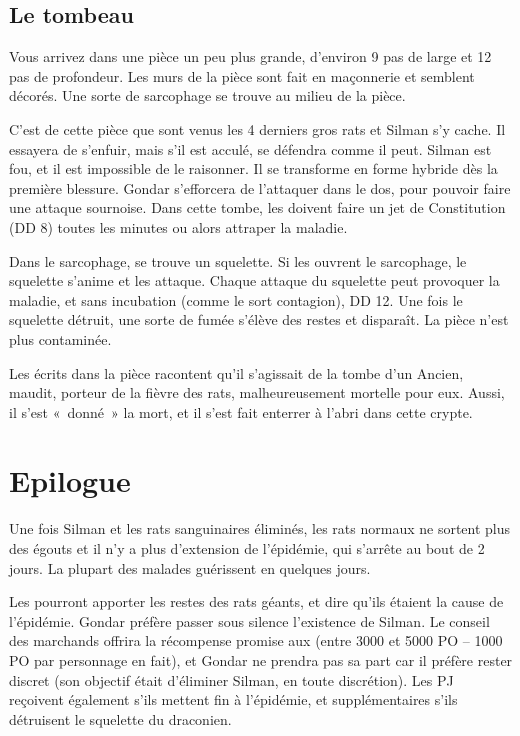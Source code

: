 \documentclass[a4paper,10pt,openany]{book}
\begin{document}
\begin{multicols}{2}
\subsection{Le tombeau}
\begin{paperbox}{ }
	Vous arrivez dans une pièce un peu plus grande, d’environ 9 pas de large et 12 pas de profondeur. Les murs de la pièce sont fait en maçonnerie et
	semblent décorés. Une sorte de sarcophage se trouve au milieu de la pièce.
\end{paperbox}

C’est de cette pièce que sont venus les 4 derniers gros rats et Silman s’y cache. Il essayera de s’enfuir, mais s’il est acculé, se défendra comme il
peut. Silman est fou, et il est impossible de le raisonner. Il se transforme en forme hybride dès la première blessure. Gondar s’efforcera de
l’attaquer dans le dos, pour pouvoir faire une attaque sournoise. Dans  cette tombe, les \PJs doivent faire un jet de Constitution (DD 8) toutes les
minutes ou alors attraper la maladie.\par Dans le sarcophage, se trouve un squelette. Si les \PJs ouvrent le sarcophage, le squelette s’anime et les
attaque. Chaque attaque du squelette peut provoquer la maladie, et sans incubation (comme le sort contagion), DD 12. Une fois le squelette détruit,
une sorte de fumée s’élève des restes et disparaît. La pièce n’est plus contaminée.\par Les écrits dans la pièce racontent qu’il s’agissait de la
tombe d’un Ancien, maudit, porteur de la fièvre des rats, malheureusement mortelle pour eux. Aussi, il s’est « donné » la mort, et il s’est fait
enterrer à l’abri dans cette crypte.

\section{Epilogue}
Une fois Silman et les rats sanguinaires éliminés, les rats normaux ne sortent plus des égouts et il n’y a plus d’extension de l’épidémie, qui
s’arrête au bout de 2 jours. La plupart des malades guérissent en quelques jours.\par Les \PJs pourront apporter les restes des rats géants, et dire
qu’ils étaient la cause de l’épidémie. Gondar préfère passer sous silence l’existence de Silman. Le conseil des marchands offrira la récompense
promise aux \PJs (entre 3000 et 5000 PO – 1000 PO par personnage en fait), et Gondar ne prendra pas sa part car il préfère rester discret (son
objectif était d’éliminer Silman, en toute discrétion). Les PJ reçoivent également  s’ils mettent fin à l’épidémie, et  supplémentaires
s’ils détruisent le squelette du draconien.


\end{multicols}
\end{document}
